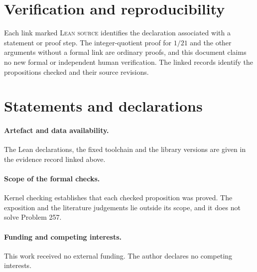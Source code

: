 \endgroup

\section*{Verification and reproducibility}
\evidenceparagraph{\evidencerecordurl}
Each link marked \textsc{Lean source} identifies the declaration associated
with a statement or proof step. The integer-quotient proof for $1/21$
and the other arguments without a formal link are ordinary proofs, and this
document claims no new formal or independent human verification. The
linked records identify the propositions checked and their source revisions.

\section*{Statements and declarations}

\paragraph{Artefact and data availability.} The Lean declarations, the fixed
toolchain and the library versions are given in the evidence record linked above.

\paragraph{Scope of the formal checks.} Kernel checking establishes that each checked
proposition was proved. The exposition and the literature judgements lie outside
its scope, and it does not solve Problem 257.

\paragraph{Funding and competing interests.} This work received no external
funding. The author declares no competing interests.

